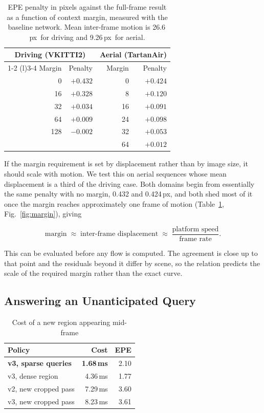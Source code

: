 \documentclass[conference]{IEEEtran}
\newcommand{\px}{\,px}
\newcommand{\ms}{\,ms}
\begin{document}
\begin{table}[t]
\caption{EPE penalty in pixels against the full-frame result as a function of
context margin, measured with the baseline network. Mean inter-frame motion is
26.6\px\ for driving and 9.26\px\ for aerial.}
\label{tab:margin}
\centering
\begin{tabular}{rr@{\qquad}rr}
\toprule
\multicolumn{2}{c}{Driving (VKITTI2)} & \multicolumn{2}{c}{Aerial (TartanAir)} \\
\cmidrule(r){1-2} \cmidrule(l){3-4}
Margin & Penalty & Margin & Penalty \\
\midrule
0   & $+0.432$ & 0  & $+0.424$ \\
16  & $+0.328$ & 8  & $+0.120$ \\
32  & $+0.034$ & 16 & $+0.091$ \\
64  & $+0.009$ & 24 & $+0.098$ \\
128 & $-0.002$ & 32 & $+0.053$ \\
    &          & 64 & $+0.012$ \\
\bottomrule
\end{tabular}
\end{table}

If the margin requirement is set by displacement rather than by image size, it
should scale with motion. We test this on aerial sequences whose mean
displacement is a third of the driving case. Both domains begin from
essentially the same penalty with no margin, 0.432 and 0.424\px, and both shed
most of it once the margin reaches approximately one frame of motion
(Table~\ref{tab:margin}, Fig.~\ref{fig:margin}), giving

\begin{equation}
\text{margin} \;\approx\; \text{inter-frame displacement} \;\approx\;
\frac{\text{platform speed}}{\text{frame rate}} .
\end{equation}

This can be evaluated before any flow is computed. The agreement is close up to
that point and the residuals beyond it differ by scene, so the relation predicts
the scale of the required margin rather than the exact curve.

\subsection{Answering an Unanticipated Query}

\begin{table}[t]
\caption{Cost of a new region appearing mid-frame}
\label{tab:s3}
\centering
\begin{tabular}{lrr}
\toprule
Policy & Cost & EPE \\
\midrule
\textbf{v3, sparse queries} & \textbf{1.68\ms} & 2.10 \\
v3, dense region & 4.36\ms & 1.77 \\
v2, new cropped pass & 7.29\ms & 3.60 \\
v3, new cropped pass & 8.23\ms & 3.61 \\
\bottomrule
\end{tabular}
\end{table}
\end{document}
